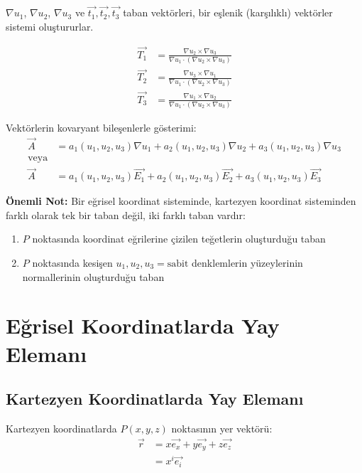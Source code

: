 \documentclass[11pt,letterpaper,twocolumn]{fenbil}
\begin{document}
$\nabla u_1$, $\nabla u_2$, $\nabla u_3$ ve $\vec{t_1}, \vec{t_2}, \vec{t_3}$ taban vektörleri, bir eşlenik (karşılıklı) vektörler sistemi oluştururlar.

\begin{align}
\vec{T_1} &= \frac{\nabla u_2 \times \nabla u_3}{\nabla u_1 \cdot (\nabla u_2 \times \nabla u_3)} \\
\vec{T_2} &= \frac{\nabla u_3 \times \nabla u_1}{\nabla u_1 \cdot (\nabla u_2 \times \nabla u_3)} \\
\vec{T_3} &= \frac{\nabla u_1 \times \nabla u_2}{\nabla u_1 \cdot (\nabla u_2 \times \nabla u_3)}
\end{align}

Vektörlerin kovaryant bileşenlerle gösterimi:
\begin{align}
\vec{A} &= a_1(u_1, u_2, u_3)\nabla u_1 + a_2(u_1, u_2, u_3)\nabla u_2 + a_3(u_1, u_2, u_3)\nabla u_3 \\
\text{veya} \\
\vec{A} &= a_1(u_1, u_2, u_3)\vec{E_1} + a_2(u_1, u_2, u_3)\vec{E_2} + a_3(u_1, u_2, u_3)\vec{E_3}
\end{align}

\textbf{Önemli Not:} Bir eğrisel koordinat sisteminde, kartezyen koordinat sisteminden farklı olarak tek bir taban değil, iki farklı taban vardır:
\begin{enumerate}
    \item $P$ noktasında koordinat eğrilerine çizilen teğetlerin oluşturduğu taban
    \item $P$ noktasında kesişen $u_1, u_2, u_3 = \text{sabit}$ denklemlerin yüzeylerinin normallerinin oluşturduğu taban
\end{enumerate}

\section{Eğrisel Koordinatlarda Yay Elemanı}

\subsection{Kartezyen Koordinatlarda Yay Elemanı}

Kartezyen koordinatlarda $P(x, y, z)$ noktasının yer vektörü:
\begin{align}
\vec{r} &= x\vec{e_x} + y\vec{e_y} + z\vec{e_z} \\
&= x^i\vec{e_i}
\end{align}
\end{document}
